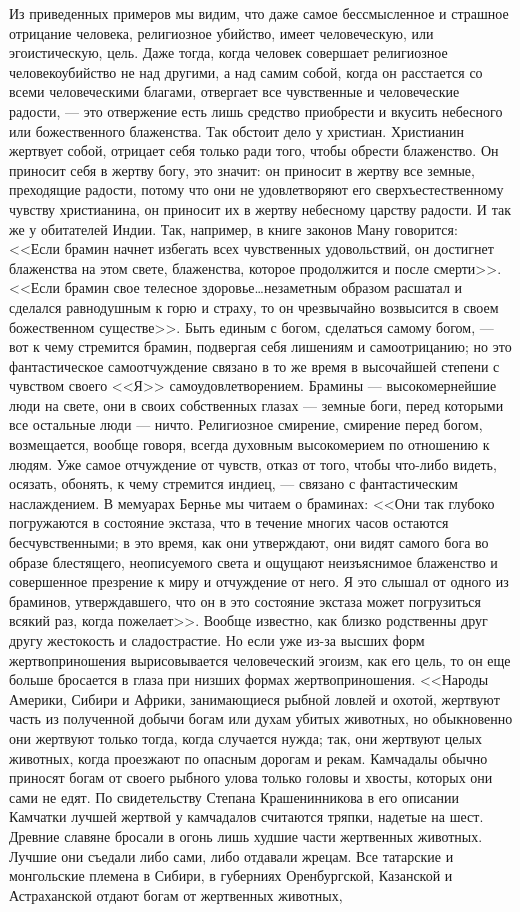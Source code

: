 \documentclass[12pt]{article}
\begin{document}
Из приведенных примеров мы видим, что даже самое бессмысленное и страшное отрицание человека, религиозное убийство, имеет человеческую, или эгоистическую, цель. Даже тогда, когда человек совершает религиозное человекоубийство не над другими, а над самим собой, когда он расстается со всеми человеческими благами, отвергает все чувственные и человеческие радости, --- это отвержение есть лишь средство приобрести и вкусить небесного или божественного блаженства. Так обстоит дело у христиан. Христианин жертвует собой, отрицает себя только ради того, чтобы обрести блаженство. Он приносит себя в жертву богу, это значит: он приносит в жертву все земные, преходящие радости, потому что они не удовлетворяют его сверхъестественному чувству христианина, он приносит их в жертву небесному царству радости. И так же у обитателей Индии. Так, например, в книге законов Ману говорится: <<Если брамин начнет избегать всех чувственных удовольствий, он достигнет блаженства на этом свете, блаженства, которое продолжится и после смерти>>. <<Если брамин свое телесное здоровье\dots незаметным образом расшатал и сделался равнодушным к горю и страху, то он чрезвычайно возвысится в своем божественном существе>>. Быть единым с богом, сделаться самому богом, --- вот к чему стремится брамин, подвергая себя лишениям и самоотрицанию; но это фантастическое самоотчуждение связано в то же время в высочайшей степени с чувством своего <<Я>>  самоудовлетворением. Брамины --- высокомернейшие люди на свете, они в своих собственных глазах --- земные боги, перед которыми все остальные люди --- ничто. Религиозное смирение, смирение перед богом, возмещается, вообще говоря, всегда духовным высокомерием по отношению к людям. Уже самое отчуждение от чувств, отказ от того, чтобы что-либо видеть, осязать, обонять, к чему стремится индиец, --- связано с фантастическим наслаждением. В мемуарах Бернье мы читаем о браминах: <<Они так глубоко погружаются в состояние экстаза, что в течение многих часов остаются бесчувственными; в это время, как они утверждают, они видят самого бога во образе блестящего, неописуемого света и ощущают неизъяснимое блаженство и совершенное презрение к миру и отчуждение от него. Я это слышал от одного из браминов, утверждавшего, что он в это состояние экстаза может погрузиться всякий раз, когда пожелает>>. Вообще известно, как близко родственны друг другу жестокость и сладострастие. Но если уже из-за высших форм жертвоприношения вырисовывается человеческий эгоизм, как его цель, то он еще больше бросается в глаза при низших формах жертвоприношения. <<Народы Америки, Сибири и Африки, занимающиеся рыбной ловлей и охотой, жертвуют часть из полученной добычи богам или духам убитых животных, но обыкновенно они жертвуют только тогда, когда случается нужда; так, они жертвуют целых животных, когда проезжают по опасным дорогам и рекам. Камчадалы обычно приносят богам от своего рыбного улова только головы и хвосты, которых они сами не едят. По свидетельству Степана Крашенинникова в его описании Камчатки лучшей жертвой у камчадалов считаются тряпки, надетые на шест. Древние славяне бросали в огонь лишь худшие части жертвенных животных. Лучшие они съедали либо сами, либо отдавали жрецам. Все татарские и монгольские племена в Сибири, в губерниях Оренбургской, Казанской и Астраханской отдают богам от жертвенных животных, 
\end{document}
